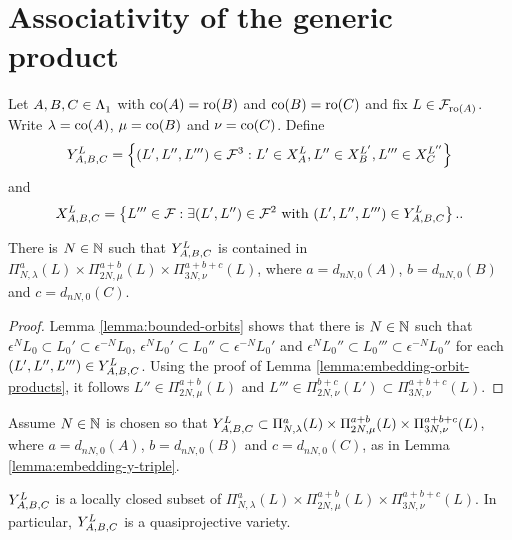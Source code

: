 \documentclass[a4paper, 11pt]{report}
\begin{document}
\section{Associativity of the generic product}

Let $A,B,C\in\matrices$ with $\co{A}=\ro{B}$ and $\co{B}=\ro{C}$ and fix $L\in\flags_{\ro{A}}$. Write $\lambda=\co{A}$, $\mu=\co{B}$ and $\nu=\co{C}$. Define
\begin{equation*}
\yprod[L]{A,B,C} = \left\{(L',L'',L''')\in\flags^3: L'\in\xprod[L]{A}, L''\in\xprod[L']{B}, L'''\in\xprod[L'']{C}\right\}
\end{equation*}
and
\begin{equation*}
\xprod[L]{A,B,C} = \left\{L'''\in\flags: \exists (L',L'')\in\flags^2 \text{ with } (L',L'',L''')\in\yprod[L]{A,B,C}\right\}..
\end{equation*}

\begin{lemma}\label{lemma:embedding-y-triple}
There is $N\in\naturals$ such that $\yprod[L]{A,B,C}$ is contained in $\Pi_{N,\lambda}^a(L)\times\Pi_{2N,\mu}^{a+b}(L)\times\Pi_{3N,\nu}^{a+b+c}(L)$, where $a=d_{nN,0}{(A)}$, $b=d_{nN,0}{(B)}$ and $c=d_{nN,0}{(C)}$.
\end{lemma}

\begin{proof}
Lemma \ref{lemma:bounded-orbits} shows that there is $N\in\naturals$ such that $\epsilon^N L_0\subset L_0'\subset\epsilon^{-N}L_0$, $\epsilon^N L_0'\subset L_0''\subset\epsilon^{-N}L_0'$ and $\epsilon^N L_0''\subset L_0'''\subset\epsilon^{-N}L_0''$ for each $(L',L'',L''')\in\yprod[L]{A,B,C}$. Using the proof of Lemma \ref{lemma:embedding-orbit-products}, it follows $L''\in\Pi_{2N,\mu}^{a+b}(L)$ and $L'''\in\Pi_{2N,\nu}^{b+c}(L')\subset\Pi_{3N,\nu}^{a+b+c}(L)$.
\end{proof}

Assume $N\in\naturals$ is chosen so that $\yprod[L]{A,B,C}\subset\Pi_{N,\lambda}^a(L)\times\Pi_{2N,\mu}^{a+b}(L)\times\Pi_{3N,\nu}^{a+b+c}(L)$, where $a=d_{nN,0}{(A)}$, $b=d_{nN,0}{(B)}$ and $c=d_{nN,0}{(C)}$, as in Lemma \ref{lemma:embedding-y-triple}.

\begin{lemma}\label{lemma:y-triple-is-quasiprojective}
$\yprod[L]{A,B,C}$ is a locally closed subset of $\Pi_{N,\lambda}^a(L)\times\Pi_{2N,\mu}^{a+b}(L)\times\Pi_{3N,\nu}^{a+b+c}(L)$. In particular, $\yprod[L]{A,B,C}$ is a quasiprojective variety.
\end{lemma}
\end{document}
